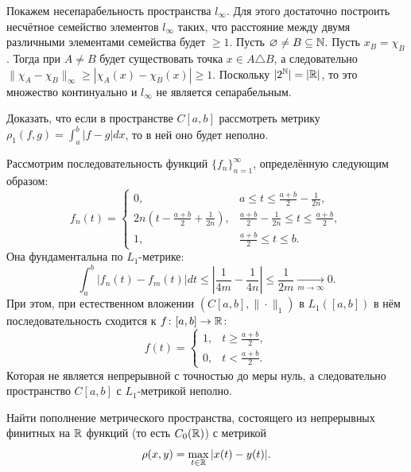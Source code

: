 \begin{solve}
    Покажем несепарабельность пространства $l_\infty$. Для этого достаточно построить несчётное семейство элементов $l_\infty$ таких, что расстояние между двумя различными элементами семейства будет $\geq 1$. Пусть $\varnothing \neq B \subseteq \mathbb{N}$. Пусть $x_B = \chi_B$. Тогда при $A \neq B$ будет существовать точка $x \in A \triangle B$, а следовательно $\|\chi_A - \chi_B\|_\infty \geq |\chi_A(x) - \chi_B(x)| \geq 1$. Поскольку $|2^{\mathbb{N}}| = |\mathbb{R}|$, то это множество континуально и $l_\infty$ не является сепарабельным.
\end{solve}
\begin{task}[\S 2.3]
    Доказать, что если в пространстве $C[a, b]$ рассмотреть метрику $\rho_1(f, g) = \int_a^b |f - g|dx$, то в ней оно будет неполно.
\end{task}
\begin{solve}
    Рассмотрим последовательность функций $\{f_n\}_{n= 1}^\infty$, определённую следующим образом:
    \[
        f_n(t) =
        \begin{cases}
            0, & a \leq t \leq \frac{a + b}{2} - \frac{1}{2n}, \\
            2n(t - \frac{a + b}{2} + \frac{1}{2n}), & \frac{a + b}{2} - \frac{1}{2n} \leq t \leq \frac{a + b}{2}, \\
            1, & \frac{a + b}{2} \leq t \leq b.
        \end{cases}
    \]
    Она фундаментальна по $L_1$-метрике:
    \[
        \int_a^b |f_n(t) - f_m(t)|dt \leq \left|\frac{1}{4m} - \frac{1}{4n}\right| \leq \dfrac{1}{2m} \xrightarrow[m \rightarrow \infty
        ]{} 0.
    \]
    При этом, при естественном вложении $(C[a, b], \|\cdot\|_1)$ в $L_1([a, b])$ в нём последовательность сходится к $f\colon [a, b] \to \mathbb{R}\colon$
    \[
        f(t) = \begin{cases}
                   1, & t \geq \frac{a + b}{2}, \\
                   0, & t < \frac{a + b}{2}.
        \end{cases}
    \]
    Которая не является непрерывной с точностью до меры нуль, а следовательно пространство $C[a, b]$ с $L_1$-метрикой неполно.
\end{solve}
\begin{task}[\S 2.6]
    Найти пополнение метрического пространства, состоящего из непрерывных финитных на $\mathbb{R}$ функций (то есть $C_0(\mathbb{R})$) с метрикой
    \[
        \rho(x, y) = \max\limits_{t \in \mathbb{R}} |x(t) - y(t)|.
    \]
\end{task}
